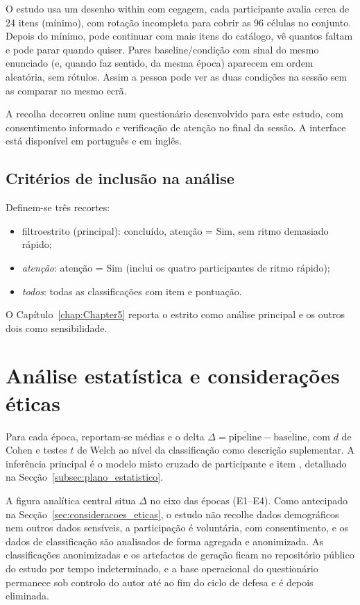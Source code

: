O estudo usa um desenho \gls{within} com cegagem, cada participante avalia cerca de 24 itens (mínimo), com rotação incompleta para cobrir as 96 células no conjunto. Depois do mínimo, pode continuar com mais itens do catálogo, vê quantos faltam e pode parar quando quiser. Pares baseline/condição com sinal do mesmo enunciado (e, quando faz sentido, da mesma época) aparecem em ordem aleatória, sem rótulos. Assim a pessoa pode ver as duas condições na sessão sem as comparar no mesmo ecrã.

A recolha decorreu online num questionário desenvolvido para este estudo, com consentimento informado e verificação de atenção no final da sessão. A interface está disponível em português e em inglês.

\subsection{Critérios de inclusão na análise}
\label{subsec:criterios_inclusao}

Definem-se três recortes:
\begin{itemize}
 \item \gls{filtroestrito} (principal): concluído, atenção = Sim, sem ritmo demasiado rápido;
 \item \textit{atenção}: atenção = Sim (inclui os quatro participantes de ritmo rápido);
 \item \textit{todos}: todas as classificações com item e pontuação.
\end{itemize}
O Capítulo~\ref{chap:Chapter5} reporta o estrito como análise principal e os outros dois como sensibilidade.


\section{Análise estatística e considerações éticas}
\label{sec:analise_etica}

Para cada época, reportam-se médias e o \gls{delta} \(\Delta = \overline{\text{pipeline}} - \overline{\text{baseline}}\), com \(d\) de Cohen e testes \(t\) de Welch ao nível da classificação como descrição suplementar. A inferência principal é o modelo misto cruzado de participante e item \parencite{Baayen2008Mixed}, detalhado na Secção~\ref{subsec:plano_estatistico}.

A figura analítica central situa \(\Delta\) no eixo das épocas (E1--E4). Como antecipado na Secção~\ref{sec:consideracoes_eticas}, o estudo não recolhe dados demográficos nem outros dados sensíveis, a participação é voluntária, com consentimento, e os dados de classificação são analisados de forma agregada e anonimizada. As classificações anonimizadas e os artefactos de geração ficam no repositório público do estudo por tempo indeterminado, e a base operacional do questionário permanece sob controlo do autor até ao fim do ciclo de defesa e é depois eliminada.

